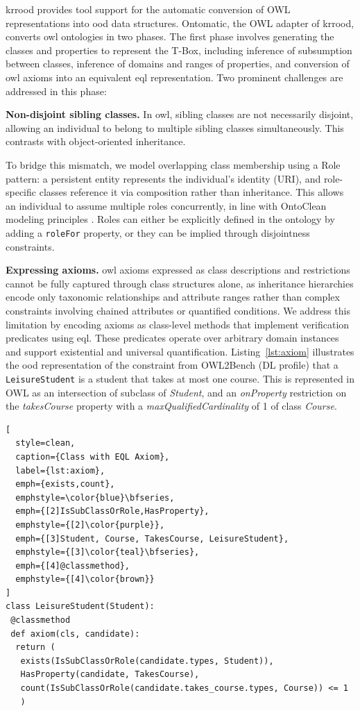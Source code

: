 \documentclass[a4paper,fleqn]{cas-sc}
\begin{document}
\ac{krrood} provides tool support for the automatic conversion of OWL representations into \ac{ood} data structures. Ontomatic, the OWL adapter of \ac{krrood}, converts \ac{owl} ontologies in two phases. The first phase involves generating the classes and properties to represent the T-Box, including inference of subsumption between classes, inference of domains and ranges of properties, and conversion of \ac{owl} axioms into an equivalent \ac{eql} representation. Two prominent challenges are addressed in this phase:

\textbf{Non-disjoint sibling classes.} In \ac{owl}, sibling classes are not necessarily disjoint, allowing an individual to belong to multiple sibling classes simultaneously. This contrasts with object-oriented inheritance.

To bridge this mismatch, we model overlapping class membership using a Role pattern: a persistent entity represents the individual's identity (URI), and role-specific classes reference it via composition rather than inheritance. This allows an individual to assume multiple roles concurrently, in line with OntoClean modeling principles \citep{Guarino2004}. Roles can either be explicitly defined in the ontology by adding a \texttt{roleFor} property, or they can be implied through disjointness constraints.

\textbf{Expressing axioms.} \ac{owl} axioms expressed as class descriptions and restrictions cannot be fully captured through class structures alone, as inheritance hierarchies encode only taxonomic relationships and attribute ranges rather than complex constraints involving chained attributes or quantified conditions. We address this limitation by encoding axioms as class-level methods that implement verification predicates using \ac{eql}. These predicates operate over arbitrary domain instances and support existential and universal quantification. Listing~\ref{lst:axiom} illustrates the \ac{ood} representation of the constraint from OWL2Bench (DL profile) that a \texttt{LeisureStudent} is a student that takes at most one course. This is represented in OWL as an intersection of subclass of \textit{Student}, and an \textit{onProperty} restriction on the \textit{takesCourse} property with a \textit{maxQualifiedCardinality} of 1 of class \textit{Course}.

\begin{lstlisting}[
  style=clean,
  caption={Class with EQL Axiom},
  label={lst:axiom},
  emph={exists,count},
  emphstyle=\color{blue}\bfseries,
  emph={[2]IsSubClassOrRole,HasProperty},
  emphstyle={[2]\color{purple}},
  emph={[3]Student, Course, TakesCourse, LeisureStudent},
  emphstyle={[3]\color{teal}\bfseries},
  emph={[4]@classmethod},
  emphstyle={[4]\color{brown}}
]
class LeisureStudent(Student):
 @classmethod
 def axiom(cls, candidate):
  return (
   exists(IsSubClassOrRole(candidate.types, Student)),
   HasProperty(candidate, TakesCourse),
   count(IsSubClassOrRole(candidate.takes_course.types, Course)) <= 1
   )
\end{lstlisting}
\end{document}
